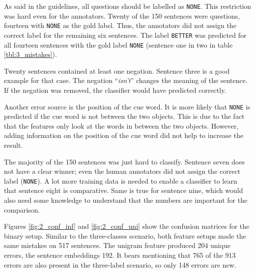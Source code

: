 As said in the guidelines, all questions should be labelled as \texttt{NONE}. This restriction was hard even for the annotators. Twenty of the 150 sentences were questions, fourteen with \texttt{NONE} as the gold label. Thus, the annotators did not assign the correct label for the remaining six sentences. The label \texttt{BETTER} was predicted for all fourteen sentences with the gold label \texttt{NONE} (sentence one in two in table  \ref{tbl:3_mistakes}).

Twenty sentences contained at least one negation. Sentence three  is a good example for that case. The negation \enquote{\emph{isn't}} changes the meaning of the sentence. If the negation was removed, the classifier would have predicted correctly.


Another error source is the position of the cue word. It is more likely that \texttt{NONE} is predicted if the cue word is not between the two objects. This is due to the fact that the features only look at the words in between the two objects. However, adding information on the position of the cue word did not help to increase the result. %

The majority of the 150 sentences was just hard to classify. Sentence seven does not have a clear winner; even the human annotators did not assign the correct label (\texttt{NONE}). A lot more training data is needed to enable a classifier to learn that sentence eight is comparative. Same is true for sentence nine, which would also need some knowledge to understand that the numbers are important for the comparison.\newline \newline 



Figures \ref{fig:2_conf_inf} and \ref{fig:2_conf_uni} show the confusion matrices for the binary setup. Similar to the three-classes scenario, both feature setups made the same mistakes on 517 sentences. The unigram feature produced 204 unique errors, the sentence embeddings 192. It bears mentioning that 765 of the 913 errors are also present in the three-label scenario, so only 148 errors are new. 

